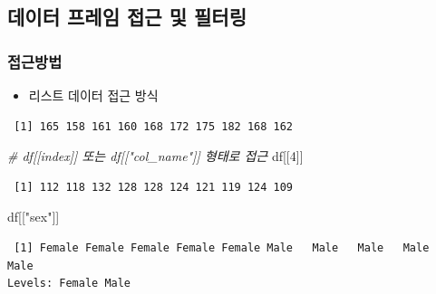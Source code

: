 \documentclass[
  11pt,
]{krantz}
\newenvironment{Shaded}{\begin{snugshade}}{\end{snugshade}}
\newcommand{\CommentTok}[1]{\textcolor[rgb]{0.37,0.37,0.37}{\textit{#1}}}
\newcommand{\DecValTok}[1]{\textcolor[rgb]{0.06,0.06,0.06}{#1}}
\newcommand{\NormalTok}[1]{#1}
\newcommand{\SpecialCharTok}[1]{\textcolor[rgb]{0,0,0}{#1}}
\newcommand{\StringTok}[1]{\textcolor[rgb]{0.5,0.5,0.5}{#1}}
\providecommand{\tightlist}{%
  \setlength{\itemsep}{0pt}\setlength{\parskip}{0pt}}
\begin{document}
\normalsize

\hypertarget{data-frame-get}{%
\subsection{데이터 프레임 접근 및 필터링}\label{data-frame-get}}

\hypertarget{data-frame-index}{%
\subsubsection*{접근방법}\label{data-frame-index}}


\begin{itemize}
\tightlist
\item
  리스트 데이터 접근 방식
\end{itemize}

\footnotesize

\begin{Shaded}
\end{Shaded}

\begin{verbatim}
 [1] 165 158 161 160 168 172 175 182 168 162
\end{verbatim}

\begin{Shaded}
\begin{Highlighting}[]
\CommentTok{\# df[[index]] 또는 df[["col\_name"]] 형태로 접근}
\NormalTok{df[[}\DecValTok{4}\NormalTok{]]}
\end{Highlighting}
\end{Shaded}

\begin{verbatim}
 [1] 112 118 132 128 128 124 121 119 124 109
\end{verbatim}

\begin{Shaded}
\begin{Highlighting}[]
\NormalTok{df[[}\StringTok{"sex"}\NormalTok{]]}
\end{Highlighting}
\end{Shaded}

\begin{verbatim}
 [1] Female Female Female Female Female Male   Male   Male   Male   Male  
Levels: Female Male
\end{verbatim}
\end{document}
